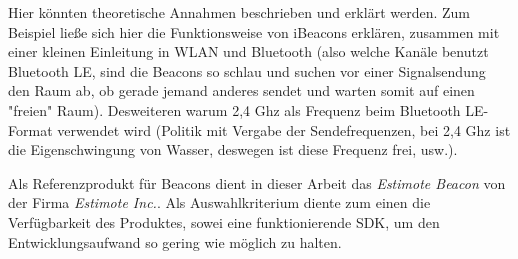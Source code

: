 Hier könnten theoretische Annahmen beschrieben und erklärt werden. Zum Beispiel ließe sich hier die Funktionsweise von iBeacons erklären, zusammen mit einer kleinen Einleitung in WLAN und Bluetooth (also welche Kanäle benutzt Bluetooth LE, sind die Beacons so schlau und suchen vor einer Signalsendung den Raum ab, ob gerade jemand anderes sendet und warten somit auf einen "freien" Raum). Desweiteren warum 2,4 Ghz als Frequenz beim Bluetooth LE-Format verwendet wird (Politik mit Vergabe der Sendefrequenzen, bei 2,4 Ghz ist die Eigenschwingung von Wasser, deswegen ist diese Frequenz frei, usw.).

Als Referenzprodukt für Beacons dient in dieser Arbeit das \textit{Estimote Beacon} von der Firma \textit{Estimote Inc.}. Als Auswahlkriterium diente zum einen die Verfügbarkeit des Produktes, sowei eine funktionierende SDK, um den Entwicklungsaufwand so gering wie möglich zu halten.

